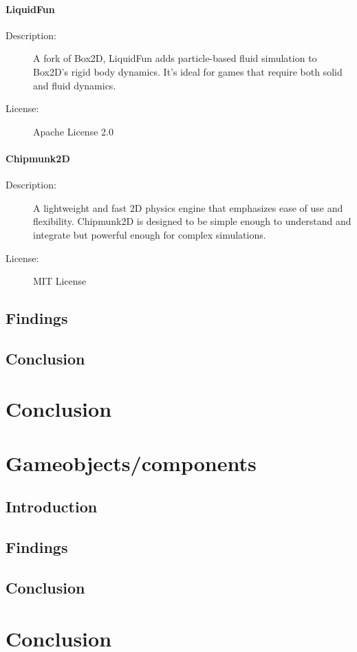 \documentclass{projdoc}
\begin{document}
\paragraph{LiquidFun}
\begin{description}
	\item[Description:] A fork of Box2D, LiquidFun adds particle-based fluid simulation to Box2D's rigid body dynamics. It’s ideal for games that require both solid and fluid dynamics.
	\item[License:] Apache License 2.0
\end{description}

\paragraph{Chipmunk2D}
\begin{description}
	\item[Description:] A lightweight and fast 2D physics engine that emphasizes ease of use and flexibility. Chipmunk2D is designed to be simple enough to understand and integrate but powerful enough for complex simulations.
	\item[License:] MIT License
\end{description}



\subsection{Findings}

\subsection{Conclusion}

\section{Conclusion}

\section{Gameobjects/components}

\subsection{Introduction}

\subsection{Findings}

\subsection{Conclusion}

\section{Conclusion}
\end{document}
